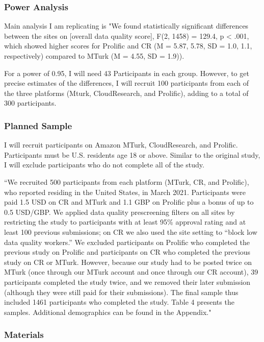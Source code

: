 \documentclass[
]{article}
\begin{document}
\hypertarget{power-analysis}{%
\subsubsection{Power Analysis}\label{power-analysis}}

Main analysis I am replicating is "We found statistically significant
differences between the sites on {[}overall data quality score{]}, F(2,
1458) = 129.4, p \textless{} .001, which showed higher scores for
Prolific and CR (M = 5.87, 5.78, SD = 1.0, 1.1, respectively) compared
to MTurk (M = 4.55, SD = 1.9)).

For a power of 0.95, I will need 43 Participants in each group. However,
to get precise estimates of the differences, I will recruit 100
participants from each of the three platforms (Mturk, CloudResearch, and
Prolific), adding to a total of 300 participants.

\hypertarget{planned-sample}{%
\subsubsection{Planned Sample}\label{planned-sample}}

I will recruit participants on Amazon MTurk, CloudResearch, and
Prolific. Participants must be U.S. residents age 18 or above. Similar
to the original study, I will exclude participants who do not complete
all of the study.

``We recruited 500 participants from each platform (MTurk, CR, and
Prolific), who reported residing in the United States, in March 2021.
Participants were paid 1.5 USD on CR and MTurk and 1.1 GBP on Prolific
plus a bonus of up to 0.5 USD/GBP. We applied data quality prescreening
filters on all sites by restricting the study to participants with at
least 95\% approval rating and at least 100 previous submissions; on CR
we also used the site setting to ``block low data quality workers.'' We
excluded participants on Prolific who completed the previous study on
Prolific and participants on CR who completed the previous study on CR
or MTurk. However, because our study had to be posted twice on MTurk
(once through our MTurk account and once through our CR account), 39
participants completed the study twice, and we removed their later
submission (although they were still paid for their submissions). The
final sample thus included 1461 participants who completed the study.
Table 4 presents the samples. Additional demographics can be found in
the Appendix."

\hypertarget{materials}{%
\subsubsection{Materials}\label{materials}}
\end{document}
